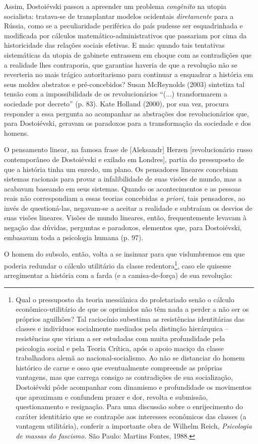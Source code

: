 Assim, Dostoiévski passou a apreender um problema \emph{congênito} na
utopia socialista: tratava-se de transplantar modelos ocidentais
\emph{diretamente} para a Rússia, como se a peculiaridade periférica do
país pudesse ser esquadrinhada e modificada por cálculos
matemático-administrativos que passariam por cima da historicidade das
relações sociais efetivas. E mais: quando tais tentativas sistemáticas
da utopia de gabinete entrassem em choque com as contradições que a
realidade lhes contraporia, que garantias haveria de que a revolução não
se reverteria no mais trágico autoritarismo para continuar a enquadrar a
história em seus moldes abstratos e pré-concebidos? Susan McReynolds
(2003) sintetiza tal tensão com a impossibilidads de os revolucionários
``(...) transformarem a sociedade por decreto'' (p. 83). Kate Holland
(2000), por sua vez, procura responder a essa pergunta ao acompanhar as
abstrações dos revolucionários que, para Dostoiévski, geravam os
paradoxos para a transformação da sociedade e dos homens.

O pensamento linear, na famosa frase de {[}Aleksandr{]} Herzen
{[}revolucionário russo contemporâneo de Dostoiévski e exilado em
Londres{]}, partia do pressuposto de que a história tinha um enredo, um
plano. Os pensadores lineares concebiam sistemas racionais para provar a
infalibilidade de suas visões de mundo, mas a acabavam baseando em seus
sistemas. Quando os acontecimentos e as pessoas reais não correspondiam
a essas teorias concebidas \emph{a priori}, tais pensadores, ao invés de
questioná-las, negavam-se a aceitar a realidade e subtraíam os desvios
de suas visões lineares. Visões de mundo lineares, então, frequentemente
levavam à negação das dúvidas, perguntas e paradoxos, elementos que,
para Dostoiévski, embasavam toda a psicologia humana (p. 97).

O homem do subsolo, então, volta a se insinuar para que vislumbremos em
que poderia redundar o cálculo utilitário da classe redentora\footnote{Qual
  o pressuposto da teoria messiânica do proletariado senão o cálculo
  econômico-utilitário de que os oprimidos não têm nada a perder a não
  ser os próprios aguilhões? Tal raciocínio subestima as resistências
  identitárias das classes e indivíduos socialmente mediados pela
  distinção hierárquica -- resistências que viriam a ser estudadas com
  muita profundidade pela psicologia social e pela Teoria Crítica, após
  o apoio maciço da classe trabalhadora alemã ao nacional-socialismo. Ao
  não se distanciar do homem histórico de carne e osso que eventualmente
  compreende as próprias vantagens, mas que carrega consigo as
  contradições de sua socialização, Dostoiévski pôde acompanhar com
  dinamismo e profundidade os movimentos que aproximam e confundem
  prazer e dor, revolta e submissão, questionamento e resignação. Para
  uma discussão sobre o enrijecimento do caráter identitário que se
  contrapõe aos interesses econômicos das classes (a vantagem
  utilitária), conferir a importante obra de Wilhelm Reich,
  \emph{Psicologia de massas do fascismo.} São Paulo: Martins Fontes,
  1988.}, caso ele quisesse arregimentar a história com a farda (e a
camisa-de-força) de sua revolução:


